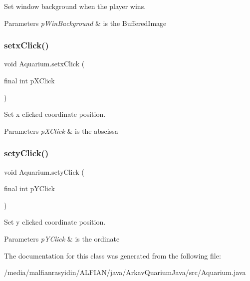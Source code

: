 Set window background when the player wins.


\begin{DoxyParams}{Parameters}
{\em p\+Win\+Background} & is the Buffered\+Image \\
\hline
\end{DoxyParams}
\mbox{\label{class_aquarium_a534d2ac777989cb7b69167ca19d3c89e}} 
\subsubsection{\texorpdfstring{setx\+Click()}{setxClick()}}
{\footnotesize\ttfamily void Aquarium.\+setx\+Click (\begin{DoxyParamCaption}\item[{final int}]{p\+X\+Click }\end{DoxyParamCaption})\hspace{0.3cm}{\ttfamily [inline]}}

Set x clicked coordinate position.


\begin{DoxyParams}{Parameters}
{\em p\+X\+Click} & is the abscissa \\
\hline
\end{DoxyParams}
\mbox{\label{class_aquarium_a13fca2e9f118bbc3a150e22c72a5eeb7}} 
\subsubsection{\texorpdfstring{sety\+Click()}{setyClick()}}
{\footnotesize\ttfamily void Aquarium.\+sety\+Click (\begin{DoxyParamCaption}\item[{final int}]{p\+Y\+Click }\end{DoxyParamCaption})\hspace{0.3cm}{\ttfamily [inline]}}

Set y clicked coordinate position.


\begin{DoxyParams}{Parameters}
{\em p\+Y\+Click} & is the ordinate \\
\hline
\end{DoxyParams}


The documentation for this class was generated from the following file\+:\begin{DoxyCompactItemize}
\item 
/media/malfianrasyidin/\+A\+L\+F\+I\+A\+N/java/\+Arkav\+Quarium\+Java/src/Aquarium.\+java\end{DoxyCompactItemize}
